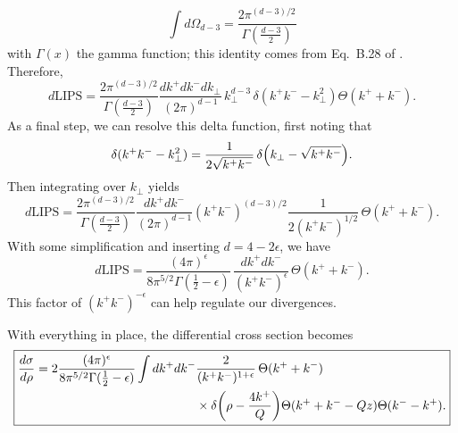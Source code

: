 \documentclass[11pt,twoside,reqno]{amsart}
\theoremstyle{plain}
\theoremstyle{remark}
\theoremstyle{definition}
\theoremstyle{remark}
\theoremstyle{definition}
\theoremstyle{definition}
\newcommand{\LIPS}{\mathrm{LIPS}}
\begin{document}
\begin{equation}
	\int d\Omega_{d - 3} = \frac{2\pi^{(d - 3)/2}}{\Gamma(\frac{d - 3}{2})}
\end{equation}
with $\Gamma(x)$ the gamma function; this identity comes from Eq.\ B.28 of \cite{schwartz_quantum_2014}. Therefore,
\begin{equation}
	d\LIPS = \frac{2\pi^{(d - 3)/2}}{\Gamma(\frac{d - 3}{2})} \frac{dk^+ dk^- dk_\perp}{(2 \pi)^{d - 1}}\,k_\perp^{d - 3}\, \delta(k^+ k^- - k_\perp^2) \Theta(k^+ + k^-).
\end{equation}
As a final step, we can resolve this delta function, first noting that
\begin{equation}
	\delta(k^+ k^- - k_\perp^2) = \frac{1}{2\sqrt{k^+ k^-}}\,\delta\qty(k_\perp - \sqrt{k^+ k^-}).
\end{equation}
Then integrating over $k_\perp$ yields
\begin{equation}
	d\LIPS = \frac{2\pi^{(d - 3)/2}}{\Gamma(\frac{d - 3}{2})} \frac{dk^+ dk^-}{(2 \pi)^{d - 1}} (k^+ k^-)^{(d - 3)/2}\frac{1}{2(k^+ k^-)^{1/2}}\,\Theta(k^+ + k^-).
\end{equation}
With some simplification and inserting $d = 4 - 2\epsilon$, we have
\begin{equation}
	d\LIPS = \frac{(4\pi)^\epsilon}{8\pi^{5/2}\Gamma(\frac{1}{2} - \epsilon)}\,\frac{dk^+ dk^-}{(k^+ k^-)^\epsilon} \, \Theta(k^+ + k^-).
\end{equation}
This factor of $(k^+ k^-)^{-\epsilon}$ can help regulate our divergences.

With everything in place, the differential cross section becomes
\begin{equation}
\boxed{
\begin{aligned}
	\frac{d\sigma}{d\rho} = 2\frac{(4\pi)^\epsilon}{8\pi^{5/2}\Gamma(\frac{1}{2} - \epsilon)} \int dk^+ dk^- & \frac{2}{(k^+ k^-)^{1 + \epsilon}} \, \Theta(k^+ + k^-) \\
		&\times \delta\qty(\rho - \frac{4 k^+}{Q})\Theta(k^+ + k^- - Qz)\Theta(k^- - k^+).
\end{aligned}
}
\end{equation}
\end{document}
